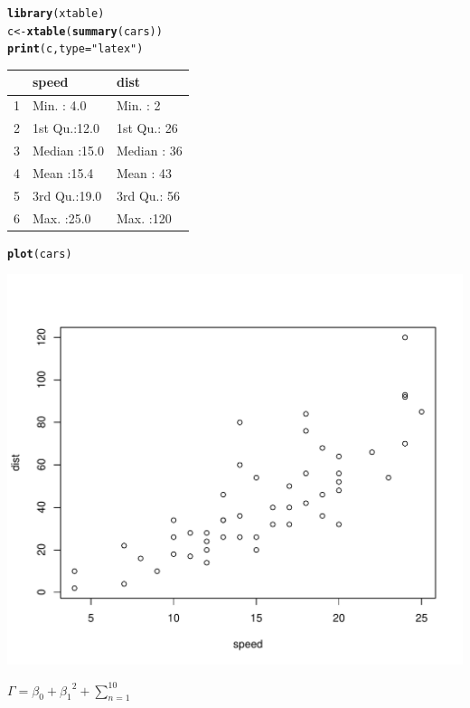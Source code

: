 \documentclass[cs4size,sub3section,UTF8,nofonts,SlantFont,fancyhdr,hyperref,fntef]{ctexart}\usepackage[]{graphicx}\usepackage[]{color}
\makeatletter
\def\maxwidth{ %
  \ifdim\Gin@nat@width>\linewidth
    \linewidth
  \else
    \Gin@nat@width
  \fi
}
\newcommand{\hlstr}[1]{\textcolor[rgb]{0.192,0.494,0.8}{#1}}%
\newcommand{\hlstd}[1]{\textcolor[rgb]{0.345,0.345,0.345}{#1}}%
\newcommand{\hlkwb}[1]{\textcolor[rgb]{0.69,0.353,0.396}{#1}}%
\newcommand{\hlkwc}[1]{\textcolor[rgb]{0.333,0.667,0.333}{#1}}%
\newcommand{\hlkwd}[1]{\textcolor[rgb]{0.737,0.353,0.396}{\textbf{#1}}}%
\newenvironment{kframe}{%
 \def\at@end@of@kframe{}%
 \ifinner\ifhmode%
  \def\at@end@of@kframe{\end{minipage}}%
  \begin{minipage}{\columnwidth}%
 \fi\fi%
 \def\FrameCommand##1{\hskip\@totalleftmargin \hskip-\fboxsep
 \colorbox{shadecolor}{##1}\hskip-\fboxsep
     \hskip-\linewidth \hskip-\@totalleftmargin \hskip\columnwidth}%
 \MakeFramed {\advance\hsize-\width
   \@totalleftmargin\z@ \linewidth\hsize
   \@setminipage}}%
 {\par\unskip\endMakeFramed%
 \at@end@of@kframe}
\makeatother
\begin{document}
\begin{kframe}
\begin{alltt}
\hlkwd{library}\hlstd{(xtable)}
\hlstd{c} \hlkwb{<-} \hlkwd{xtable}\hlstd{(}\hlkwd{summary}\hlstd{(cars))}
\hlkwd{print}\hlstd{(c,} \hlkwc{type} \hlstd{=} \hlstr{"latex"}\hlstd{)}
\end{alltt}
\end{kframe}%
\begin{table}[ht]
\centering
\begin{tabular}{rll}
  \hline
 &     speed &      dist \\ 
  \hline
1 & Min.   : 4.0   & Min.   :  2   \\ 
  2 & 1st Qu.:12.0   & 1st Qu.: 26   \\ 
  3 & Median :15.0   & Median : 36   \\ 
  4 & Mean   :15.4   & Mean   : 43   \\ 
  5 & 3rd Qu.:19.0   & 3rd Qu.: 56   \\ 
  6 & Max.   :25.0   & Max.   :120   \\ 
   \hline
\end{tabular}
\end{table}
\begin{kframe}\begin{alltt}
\hlkwd{plot}\hlstd{(cars)}
\end{alltt}
\end{kframe}
\includegraphics[width=\maxwidth]{figure/example} 



\centering
$\Gamma = \beta_0 + {\beta_1}^2 + \sum_{n=1}^{10}$
\end{document}
